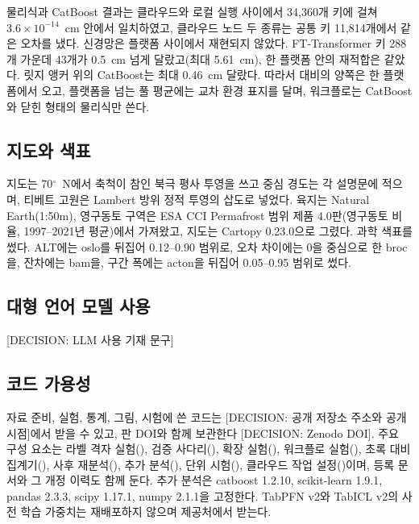 물리식과 CatBoost 결과는 클라우드와 로컬 실행 사이에서 34,360개 키에 걸쳐 $3.6 \times 10^{-14}$~cm 안에서 일치하였고, 클라우드 노드 두 종류는 공통 키 11,814개에서 같은 오차를 냈다. 신경망은 플랫폼 사이에서 재현되지 않았다. FT-Transformer 키 288개 가운데 43개가 0.5~cm 넘게 달랐고(최대 5.61~cm), 한 플랫폼 안의 재적합은 같았다. 릿지 앵커 위의 CatBoost는 최대 0.46~cm 달랐다. 따라서 대비의 양쪽은 한 플랫폼에서 오고, 플랫폼을 넘는 풀 평균에는 교차 환경 표지를 달며, 워크플로는 CatBoost와 닫힌 형태의 물리식만 쓴다.

\subsection{지도와 색표}\label{sec:m-maps}

지도는 70$^{\circ}$~N에서 축척이 참인 북극 평사 투영을 쓰고 중심 경도는 각 설명문에 적으며, 티베트 고원은 Lambert 방위 정적 투영의 삽도로 넣었다. 육지는 Natural Earth(1:50m), 영구동토 구역은 ESA CCI Permafrost 범위 제품 4.0판(영구동토 비율, 1997--2021년 평균)에서 가져왔고, 지도는 Cartopy 0.23.0으로 그렸다. 과학 색표\cite{Crameri2018Zenodo,Crameri2020}를 썼다. ALT에는 oslo를 뒤집어 0.12--0.90 범위로, 오차 차이에는 0을 중심으로 한 broc을, 잔차에는 bam을, 구간 폭에는 acton을 뒤집어 0.05--0.95 범위로 썼다.

\subsection{대형 언어 모델 사용}\label{sec:m-llm}

[DECISION: LLM 사용 기재 문구]

\subsection{코드 가용성}\label{sec:m-code}

자료 준비, 실험, 통계, 그림, 시험에 쓴 코드는 [DECISION: 공개 저장소 주소와 공개 시점]에서 받을 수 있고, 판 DOI와 함께 보관한다 [DECISION: Zenodo DOI]. 주요 구성 요소는 라벨 격자 실험(), 검증 사다리(), 확장 실험(), 워크플로 실험(), 초록 대비 집계기(), 사후 재분석(), 추가 분석(), 단위 시험(), 클라우드 작업 설정()이며, 등록 문서와 그 개정 이력도 함께 둔다. 추가 분석은 catboost 1.2.10, scikit-learn 1.9.1, pandas 2.3.3, scipy 1.17.1, numpy 2.1.1을 고정한다. TabPFN v2와 TabICL v2의 사전 학습 가중치는 재배포하지 않으며 제공처에서 받는다.
